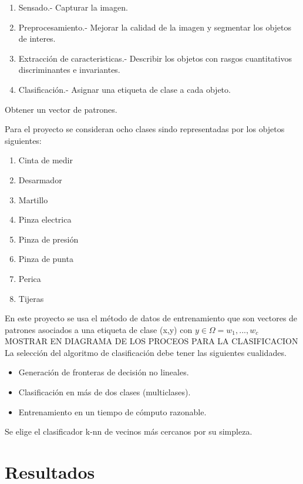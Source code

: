 \documentclass[a4paper, 11pt]{article}
\begin{document}
\begin{enumerate}
\item Sensado.- Capturar la imagen.
\item Preprocesamiento.- Mejorar la calidad de la imagen y segmentar los objetos de interes.
\item Extracción de caracteristicas.- Describir los objetos con rasgos cuantitativos discriminantes e invariantes.
\item Clasificación.- Asignar una etiqueta de clase a cada objeto.
\end{enumerate}

Obtener un vector de patrones.

Para el proyecto se consideran ocho clases sindo representadas por los objetos siguientes:

\begin{enumerate}
\item Cinta de medir
\item Desarmador
\item Martillo
\item Pinza electrica
\item Pinza de presión
\item Pinza de punta
\item Perica
\item Tijeras
\end{enumerate}

En este proyecto se usa el método de datos de entrenamiento que son vectores de patrones asociados a una etiqueta de clase (x,y) con $y \in \Omega = {w_{1},...,w_{c}}$\\

MOSTRAR EN DIAGRAMA DE LOS PROCEOS PARA LA CLASIFICACION\\

La selección del algoritmo de clasificación debe tener las siguientes cualidades.

\begin{itemize}
\item Generación de fronteras de decisión no lineales.
\item Clasificación en más de dos clases (multiclases).
\item Entrenamiento en un tiempo de cómputo razonable. 
\end{itemize}

Se elige el clasificador k-nn de vecinos más cercanos por su simpleza.

\newpage
\section{Resultados}
\end{document}
